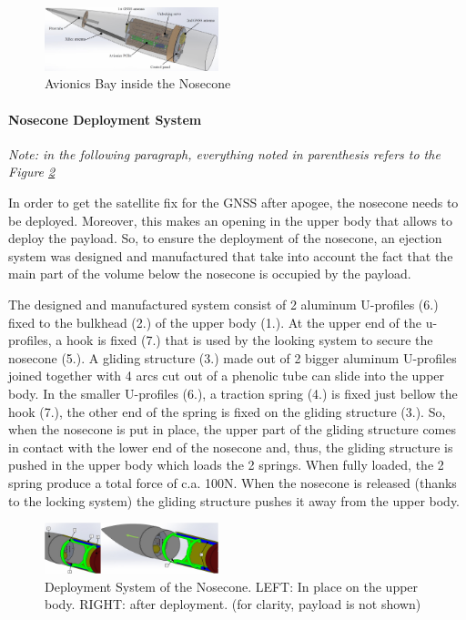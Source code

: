   \begin{figure}[h!]
 	\centering
        \includegraphics[width=0.45\textwidth]{img/AV_FIG_CAD_nosecone.jpg}
        \caption{Avionics Bay inside the Nosecone}
        \label{f:avionics_bay}
 \end{figure}

\paragraph{Nosecone Deployment System}
 \hfill \break
\textit{Note: in the following paragraph, everything noted in parenthesis refers to the Figure \ref{f:av_deployment_sys}}

In order to get the satellite fix for the GNSS after apogee, the nosecone needs to be deployed. Moreover, this makes an opening in the upper body that allows to deploy the payload. So, to ensure the deployment of the nosecone, an ejection system was designed and manufactured that take into account the fact that the
main part of the volume below the nosecone is occupied by the payload.

The designed and manufactured system consist of 2 aluminum U-profiles (6.) fixed to the bulkhead (2.) of the upper body (1.). At the upper end of the u-profiles, a hook is fixed (7.) that is used by the looking system to secure the nosecone (5.). A gliding structure (3.) made out of 2 bigger aluminum U-profiles joined together with 4 arcs cut out of a phenolic tube can slide into the upper body.
In the smaller U-profiles (6.), a traction spring (4.) is fixed just bellow the hook (7.), the other end of the spring is fixed on the gliding structure (3.). So, when the nosecone is put in place, the upper part of the gliding structure comes in contact with the lower end of the nosecone and, thus, the gliding structure is pushed in the upper body which loads the 2 springs. When fully loaded, the 2 spring produce a total force of c.a. 100N. When the nosecone is released (thanks to the locking system) the gliding structure pushes it away from the upper body.

  \begin{figure}[h!]
 	\centering
        \includegraphics[width=0.45\textwidth]{img/AV_FIG_CAD_depl_sys_1.jpg}
        \caption{Deployment System of the Nosecone. LEFT: In place on the upper body. RIGHT: after deployment. (for clarity, payload is not shown)}
        \label{f:av_deployment_sys}
 \end{figure}

